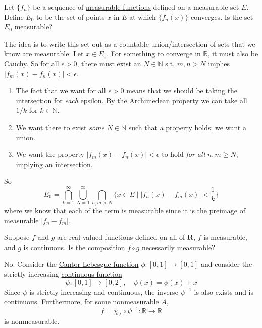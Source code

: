   \begin{exercise}[Royden 3.9]
    Let $\{f_n\}$ be a sequence of \hyperref[def:measurable-function]{measurable functions} defined on a measurable set $E$. Define $E_0$ to be the set of points $x$ in $E$ at which $\{f_n(x)\}$ converges. Is the set $E_0$ measurable?
  \end{exercise}
  \begin{solution}
    The idea is to write this set out as a countable union/intersection of sets that we know are measurable. Let $x \in E_0$. For something to converge in $\mathbb{R}$, it must also be Cauchy. So for all $\epsilon > 0$, there must exist an $N \in \mathbb{N}$ s.t. $m, n > N$ implies $|f_m (x) - f_n (x)| < \epsilon$. 
    \begin{enumerate}
      \item The fact that we want for all $\epsilon > 0$ means that we should be taking the intersection for \textit{each} epsilon. By the Archimedean property we can take all $1/k$ for $k \in \mathbb{N}$.  
      \item We want there to exist \textit{some} $N \in \mathbb{N}$ such that a property holds: we want a union. 
      \item We want the property $|f_m (x) - f_n (x)| < \epsilon$ to hold \textit{for all} $n, m \geq N$, implying an intersection. 
    \end{enumerate}
    So 
    \begin{equation}
      E_0 = \bigcap_{k=1}^\infty \bigcup_{N=1}^\infty \bigcap_{n, m > N} \{ x \in E \mid |f_n (x) - f_m (x)| < \frac{1}{k} \}
    \end{equation} 
    where we know that each of the term is measurable since it is the preimage of measurable $|f_n - f_m|$. 
  \end{solution}

  \begin{exercise}[Royden 3.10]
    Suppose $f$ and $g$ are real-valued functions defined on all of $\mathbf{R}$, $f$ is measurable, and $g$ is continuous. Is the composition $f \circ g$ necessarily measurable?
  \end{exercise}
  \begin{solution}
    No. Consider the \hyperref[real-def:cantor-lebesgue-function-devils-staircase]{Cantor-Lebesgue function} $\phi: [0, 1] \to [0, 1]$ and consider the strictly increasing \hyperref[pst-def:continuous_func]{continuous function} 
    \begin{equation}
      \psi: [0, 1] \to [0, 2], \quad \psi(x) = \phi(x) + x
    \end{equation}
    Since $\psi$ is strictly increasing and continuous, the inverse $\psi^{-1}$ is also exists and is continuous. Furthermore, for some nonmeasurable $A$, 
    \begin{equation}
      f = \chi_A \circ \psi^{-1} : \mathbb{R} \to \mathbb{R}
    \end{equation}
    is nonmeasurable. 
  \end{solution}

